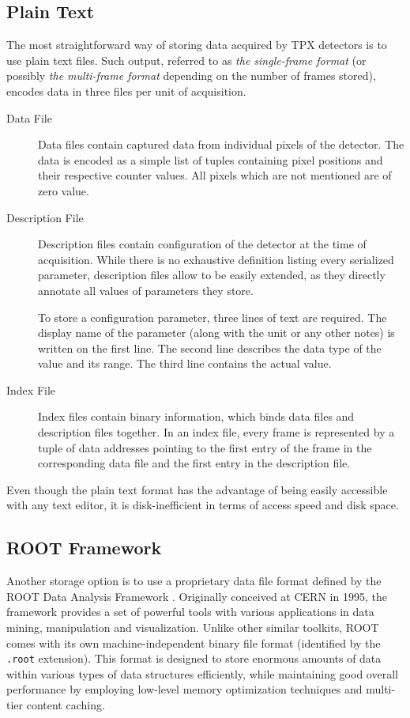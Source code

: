 \subsection{Plain Text}
The most straightforward way of storing data acquired by TPX detectors is to use plain text files. Such output, referred to as \textit{the single-frame format} (or possibly \textit{the multi-frame format} depending on the number of frames stored), encodes data in three files per unit of acquisition.

\begin{description}
	\item[Data File]
	Data files contain captured data from individual pixels of the detector. The data is encoded as a simple list of tuples containing pixel positions and their respective counter values. All pixels which are not mentioned are of zero value.

	\item[Description File]
	Description files contain configuration of the detector at the time of acquisition. While there is no exhaustive definition listing every serialized parameter, description files allow to be easily extended, as they directly annotate all values of parameters they store.

	To store a configuration parameter, three lines of text are required. The display name of the parameter (along with the unit or any other notes) is written on the first line. The second line describes the data type of the value and its range. The third line contains the actual value.

	\item[Index File]
	Index files contain binary information, which binds data files and description files together. In an index file, every frame is represented by a tuple of data addresses pointing to the first entry of the frame in the corresponding data file and the first entry in the description file.
\end{description}

Even though the plain text format has the advantage of being easily accessible with any text editor, it is disk-inefficient in terms of access speed and disk space.

\subsection{ROOT Framework}
\label{storage:ROOT}
Another storage option is to use a proprietary data file format defined by the ROOT Data Analysis Framework \cite{ROOT}. Originally conceived at CERN in 1995, the framework provides a set of powerful tools with various applications in data mining, manipulation and visualization. Unlike other similar toolkits, ROOT comes with its own machine-independent binary file format (identified by the \texttt{.root} extension). This format is designed to store enormous amounts of data within various types of data structures efficiently, while maintaining good overall performance by employing low-level memory optimization techniques and multi-tier content caching.

